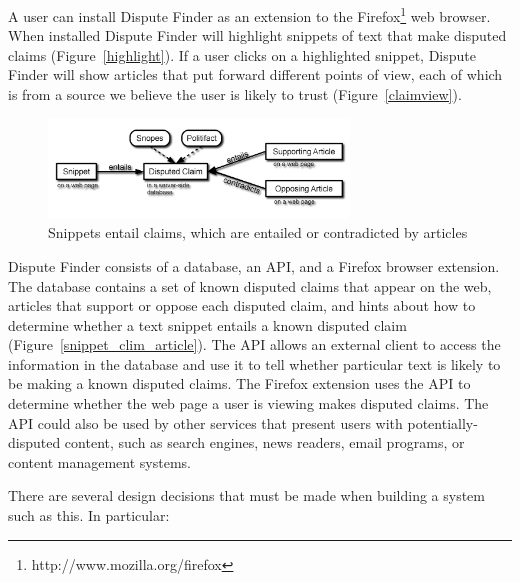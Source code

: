 \documentclass{www2010-submission}
\newcommand{\todo}[1]{}
\begin{document}
A user can install Dispute Finder as an extension to the Firefox\footnote{http://www.mozilla.org/firefox} web browser. When installed Dispute Finder will highlight snippets of text that make disputed claims (Figure~\ref{highlight}). 
If a user clicks on a highlighted snippet, Dispute Finder will show articles that put forward different points of view,  each of which is from a source we believe the user is likely to trust (Figure~\ref{claimview}). 

\begin{figure}[tb]
	\begin{center}
	\includegraphics[width=8cm]{pictures/snippet_claim_article_fancy2.png}
	\caption{Snippets entail claims, which are entailed or contradicted by articles}
	\label{snippet_claim_article}
	\end{center}
\end{figure}

Dispute Finder consists of a database, an API, and a Firefox browser extension. The database contains a set of known disputed claims that appear on the web, articles that support or oppose each disputed claim, and hints about how to determine whether a text snippet entails a known disputed claim (Figure~\ref{snippet_clim_article}). The API allows an external client to access the information in the database and use it to tell whether particular text is likely to be making a known disputed claims. The Firefox extension uses the API to determine whether the web page a user is viewing makes disputed claims. The API could also be used by other services that present users with potentially-disputed content, such as search engines, news readers, email programs, or content management systems.

\todo{Figure that does a smaller highlight}

There are several design decisions that must be made when building a system such as this. In particular:
\end{document}
